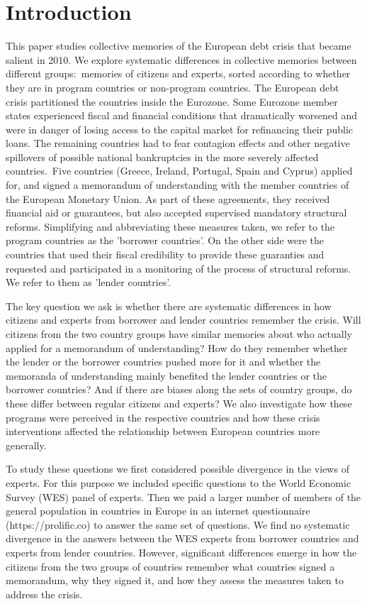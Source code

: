 \section{Introduction}

This paper studies collective memories of the European debt crisis that
became salient in 2010. We explore systematic differences in collective
memories between different groups:\ memories of citizens and experts, sorted
according to whether they are in program countries or non-program countries.
The European debt crisis partitioned the countries inside the Eurozone. Some
Eurozone member states experienced fiscal and financial conditions that
dramatically worsened and were in danger of losing access to the capital
market for refinancing their public loans. The remaining countries had to
fear contagion effects and other negative spillovers of possible national
bankruptcies in the more severely affected countries.\ Five countries
(Greece, Ireland, Portugal, Spain and Cyprus) applied for, and signed a
memorandum of understanding with the member countries of the European
Monetary Union. As part of these agreements, they received financial aid or
guarantees, but also accepted supervised mandatory structural reforms.
Simplifying and abbreviating these measures taken, we refer to the program
countries as the 'borrower countries'. On the other side were the countries
that used their fiscal credibility to provide these guaranties and requested
and participated in a monitoring of the process of structural reforms. We
refer to them as 'lender countries'.

The key question we ask is whether there are systematic differences in how
citizens and experts from borrower and lender countries remember the crisis.
Will citizens from the two country groups have similar memories about who
actually applied for a memorandum of understanding? How do they remember
whether the lender or the borrower countries pushed more for it and whether
the memoranda of understanding mainly benefited the lender countries or the
borrower countries? And if there are biases along the sets of country
groups, do these differ between regular citizens and experts? We also
investigate how these programs were perceived in the respective countries
and how these crisis interventions affected the relationship between European
countries more generally.\ 

To study these questions we first considered possible divergence in the
views of experts. For this purpose we included specific questions to the
World Economic Survey (WES) panel of experts. Then we paid a larger number
of members of the general population in countries in Europe in an internet
questionnaire (https://prolific.co) to answer the same set of questions. We
find no systematic divergence in the answers between the WES experts from
borrower countries and experts from lender countries. However, significant
differences emerge in how the citizens from the two groups of countries
remember what countries signed a memorandum, why they signed it, and how
they assess the measures taken to address the crisis.

